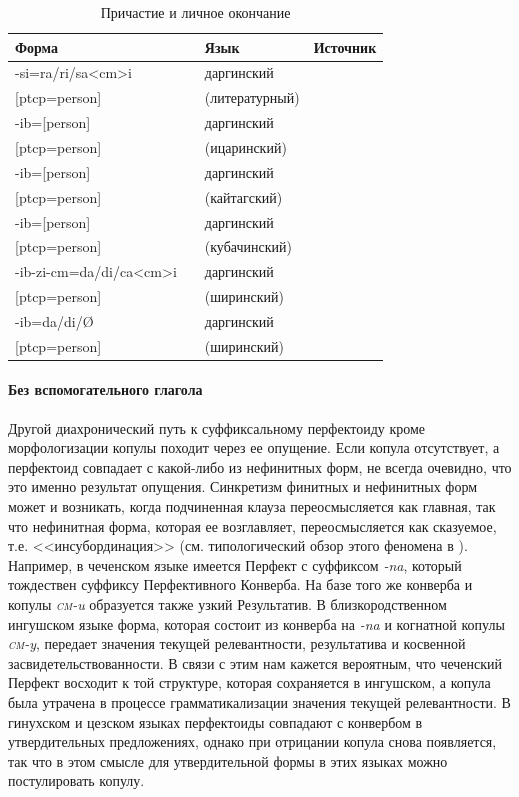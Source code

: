 \begin{table}[ht]
\caption{Причастие и личное окончание}
\label{tab:ptcppers}
\vspace{0.2cm}
\begin{center}
\begin{tabular}{ll|ll}
\multicolumn{2}{l|}{Форма} & Язык      & Источник   \\ \hline
-si=ra/ri/sa<cm>i 	&		&	даргинский	&	\citep{mutalov2018}	\\
{[}ptcp=person{]}	&		&	(литературный)	&		\\
-ib={[}person{]} 	&		&	даргинский	&	\citep{belyaev2018}	\\
{[}ptcp=person{]}	&		&	(ицаринский)	&		\\
-ib={[}person{]} 	&		&	даргинский	&	\citep{belyaev2018}	\\
{[}ptcp=person{]}	&		&	(кайтагский)	&		\\
-ib={[}person{]} 	&		&	даргинский	&	\citep{belyaev2018}	\\
{[}ptcp=person{]}	&		&	(кубачинский)	&		\\
-ib-zi-cm=da/di/ca<cm>i 	&		&	даргинский	&	\citep{belyaev2018}	\\
{[}ptcp=person{]}	&		&	(ширинский)	&		\\
-ib=da/di/Ø 	&		&	даргинский	&	\citep{belyaev2018}	\\
{[}ptcp=person{]}	&		&	(ширинский)	&		\\
\end{tabular}
\end{center}
\end{table}

\paragraph{Без вспомогательного глагола} \label{sec:pfzero}

Другой диахронический путь к суффиксальному перфектоиду кроме морфологизации копулы походит через ее опущение. Если копула отсутствует, а перфектоид совпадает с какой-либо из нефинитных форм, не всегда очевидно, что это именно результат опущения. Синкретизм финитных и нефинитных форм может и возникать, когда подчиненная клауза переосмысляется как главная, так что нефинитная форма, которая ее возглавляет, переосмысляется как сказуемое, т.е. <<инсубординация>> (см. типологический обзор этого феномена в \citep{evans2007}). Например, в чеченском языке имеется Перфект с суффиксом \textit{-na}, который тождествен суффиксу Перфективного Конверба. На базе того же конверба и копулы \textit{\textsc{cm}-u} образуется также узкий Результатив. В близкородственном ингушском языке форма, которая состоит из конверба на \textit{-na} и когнатной копулы \textit{\textsc{cm}-y}, передает значения текущей релевантности, результатива и косвенной засвидетельствованности. В связи с этим нам кажется вероятным, что чеченский Перфект восходит к той структуре, которая сохраняется в ингушском, а копула была утрачена в процессе грамматикализации значения текущей релевантности. В гинухском и цезском языках перфектоиды совпадают с конвербом в утвердительных предложениях, однако при отрицании копула снова появляется, так что в этом смысле для утвердительной формы в этих языках можно постулировать копулу.

